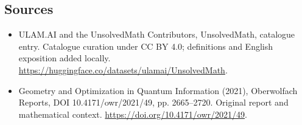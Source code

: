 \documentclass[11pt]{article}
\begin{document}
\subsection{Sources}
\begin{itemize}
\item[\hypertarget{source:statement:1}{S1}] ULAM.AI and the UnsolvedMath Contributors, UnsolvedMath, catalogue entry. Catalogue curation under CC BY 4.0; definitions and English exposition added locally.
\url{https://huggingface.co/datasets/ulamai/UnsolvedMath}.
\item[\hypertarget{source:statement:2}{S2}] Geometry and Optimization in Quantum Information (2021), Oberwolfach Reports, DOI 10.4171/owr/2021/49, pp. 2665--2720. Original report and mathematical context.
\url{https://doi.org/10.4171/owr/2021/49}.
\end{itemize}
\label{end:statement}
\end{document}
